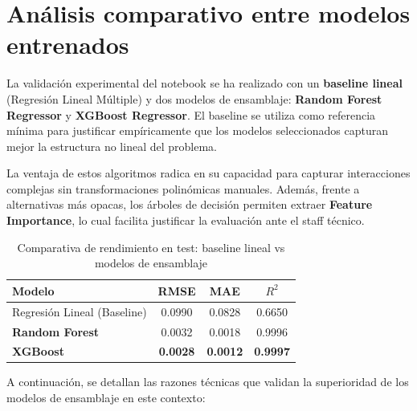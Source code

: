 \documentclass{ULBreport} %
\begin{document}
\section{Análisis comparativo entre modelos entrenados}

La validación experimental del notebook se ha realizado con un \textbf{baseline lineal} (Regresión Lineal Múltiple) y dos modelos de ensamblaje: \textbf{Random Forest Regressor} y \textbf{XGBoost Regressor}. El baseline se utiliza como referencia mínima para justificar empíricamente que los modelos seleccionados capturan mejor la estructura no lineal del problema.

La ventaja de estos algoritmos radica en su capacidad para capturar interacciones complejas sin transformaciones polinómicas manuales. Además, frente a alternativas más opacas, los árboles de decisión permiten extraer \textbf{Feature Importance}, lo cual facilita justificar la evaluación ante el staff técnico.

\begin{table}[h]
\centering
\caption{Comparativa de rendimiento en test: baseline lineal vs modelos de ensamblaje}
\begin{tabular}{|l|c|c|c|}
\hline
\textbf{Modelo} & \textbf{RMSE} & \textbf{MAE} & \textbf{$R^2$} \\ \hline
Regresión Lineal (Baseline) & 0.0990 & 0.0828 & 0.6650 \\ \hline
\textbf{Random Forest} & 0.0032 & 0.0018 & 0.9996 \\ \hline
\textbf{XGBoost} & \textbf{0.0028} & \textbf{0.0012} & \textbf{0.9997} \\ \hline
\end{tabular}
\end{table}



A continuación, se detallan las razones técnicas que validan la superioridad de los modelos de ensamblaje en este contexto:
\end{document}
